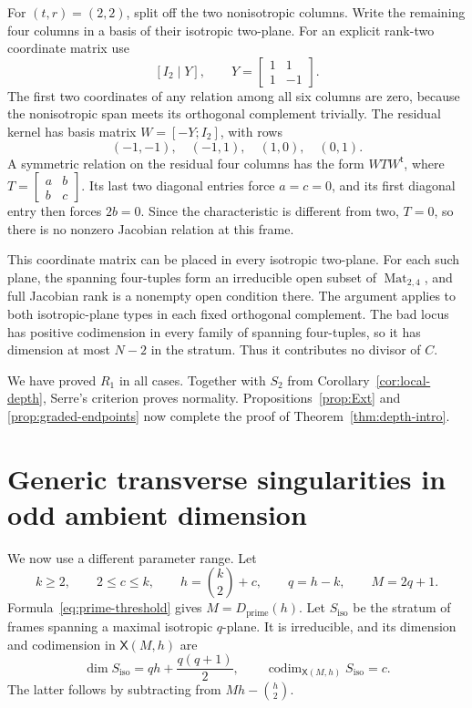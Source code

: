\documentclass[11pt]{article}
\theoremstyle{definition}
\theoremstyle{remark}
\numberwithin{equation}{section}
\DeclareMathOperator{\Mat}{Mat}
\DeclareMathOperator{\codim}{codim}
\newcommand{\XX}{\mathsf X}
\newcommand{\Dpr}{D_{\mathrm{prime}}}
\begin{document}
For $(t,r)=(2,2)$, split off the two nonisotropic columns.
Write the remaining four columns in a basis of their isotropic
two-plane. For an explicit rank-two coordinate matrix use
\[
 [I_2\mid Y],\qquad
 Y=\begin{bmatrix}1&1\\1&-1\end{bmatrix}.
\]
The first two coordinates of any relation among all six columns
are zero, because the nonisotropic span meets its orthogonal
complement trivially. The residual kernel has basis matrix
$W=[-Y;I_2]$, with rows
\[
 (-1,-1),\quad(-1,1),\quad(1,0),\quad(0,1).
\]
A symmetric relation on the residual four columns has the form
$WTW^{\mathsf t}$, where
$T=\left[\begin{smallmatrix}a&b\\b&c\end{smallmatrix}\right]$.
Its last two diagonal entries force $a=c=0$, and its first
diagonal entry then forces $2b=0$. Since the characteristic
is different from two, $T=0$, so there is no nonzero Jacobian
relation at this frame.

This coordinate matrix can be placed in every isotropic two-plane.
For each such plane, the spanning four-tuples form an irreducible
open subset of $\Mat_{2,4}$, and full Jacobian rank is a nonempty
open condition there. The argument applies to both isotropic-plane
types in each fixed orthogonal complement. The bad locus has
positive codimension in every family of spanning four-tuples, so
it has dimension at most $N-2$ in the stratum. Thus it contributes
no divisor of $C$.

We have proved $R_1$ in all cases. Together with $S_2$ from
Corollary~\ref{cor:local-depth}, Serre's criterion proves normality.
Propositions~\ref{prop:Ext} and \ref{prop:graded-endpoints} now complete
the proof of Theorem~\ref{thm:depth-intro}.

\section{Generic transverse singularities in odd ambient dimension}\label{sec:transverse}

We now use a different parameter range. Let
\begin{equation}\label{eq:odd-parameters}
 k\geq2,\qquad 2\leq c\leq k,\qquad
 h=\binom k2+c,\qquad q=h-k,\qquad M=2q+1.
\end{equation}
Formula~\eqref{eq:prime-threshold} gives $M=\Dpr(h)$.
Let $S_{\mathrm{iso}}$ be the stratum of frames spanning a maximal
isotropic $q$-plane. It is irreducible, and its dimension and codimension
in $\XX(M,h)$ are
\begin{equation}\label{eq:odd-stratum}
 \dim S_{\mathrm{iso}}=qh+\frac{q(q+1)}2,
 \qquad\codim_{\XX(M,h)}S_{\mathrm{iso}}=c.
\end{equation}
The latter follows by subtracting from $Mh-\binom h2$.
\end{document}
